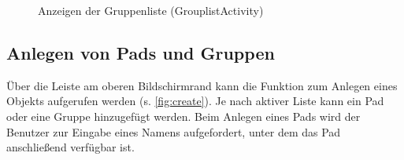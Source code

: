 \begin{figure}[h!]
    \centering
    \setlength\fboxsep{0pt}
	  \caption{Anzeigen der Gruppenliste (GrouplistActivity)}
	  \label{fig:Gruppenliste}
\end{figure}

\subsection{Anlegen von Pads und Gruppen}
Über die Leiste am oberen Bildschirmrand kann die Funktion zum Anlegen eines Objekts aufgerufen werden (s. \autoref{fig:create}).
Je nach aktiver Liste kann ein Pad oder eine Gruppe hinzugefügt werden.
Beim Anlegen eines Pads wird der Benutzer zur Eingabe eines Namens aufgefordert, unter dem das Pad anschließend verfügbar ist.

